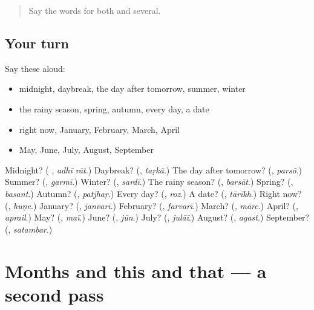 \label{lesson:PA-R107-first-pass-seasons-and-months}



\begin{quote}
Say the words for both and several.
\end{quote}

\subsection*{Your turn}
Say these aloud:

\begin{itemize}
\raggedright
  \item midnight, daybreak, the day after tomorrow, summer, winter
  \item the rainy season, spring, autumn, every day, a date
  \item right now, January, February, March, April
  \item May, June, July, August, September
\end{itemize}

\begin{tcolorbox}[breakable,colback=teal!4,colframe=teal!35!black,title={Before you move on}]
Midnight? (\textbf{ }, \emph{adhī rāt}.) Daybreak? (\textbf{}, \emph{taṛkā}.) The day after tomorrow? (\textbf{}, \emph{parsõ}.) Summer? (\textbf{}, \emph{garmī}.) Winter? (\textbf{}, \emph{sardī}.) The rainy season? (\textbf{}, \emph{barsāt}.) Spring? (\textbf{}, \emph{basant}.) Autumn? (\textbf{}, \emph{patjhaṛ}.) Every day? (\textbf{}, \emph{roz}.) A date? (\textbf{}, \emph{tārīkh}.) Right now? (\textbf{}, \emph{huṇe}.) January? (\textbf{}, \emph{janvarī}.) February? (\textbf{}, \emph{farvarī}.) March? (\textbf{}, \emph{mārc}.) April? (\textbf{}, \emph{aprail}.) May? (\textbf{}, \emph{maī}.) June? (\textbf{}, \emph{jūn}.) July? (\textbf{}, \emph{julāī}.) August? (\textbf{}, \emph{agast}.) September? (\textbf{}, \emph{satambar}.)
\end{tcolorbox}
\section[(dialogue)]{Months and this and that — a second pass}

\label{lesson:PA-R107-second-pass-months-and-this-and-that}



